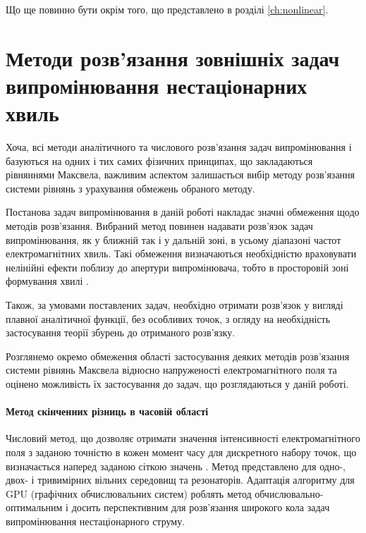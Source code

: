 Що ще повинно бути окрім того, що представлено в розділі \ref{ch:nonlinear}.

\section{Методи розв'язання зовнішніх задач випромінювання нестаціонарних хвиль}

Хоча, всі методи аналітичного та числового розв'язання задач 
випромінювання і базуються на одних і тих самих фізичних принципах, що 
закладаються рівняннями Максвела, важливим аспектом залишається вибір 
методу розв'язання системи рівнянь з урахування обмежень обраного методу. 

Постанова задач випромінювання в даній роботі накладає значні обмеження щодо 
методів розв'язання. Вибраний метод повинен надавати розв'язок задач 
випромінювання, як у ближній так і у дальній зоні, в усьому діапазоні 
частот електромагнітних хвиль. Такі обмеження визначаються 
необхідністю враховувати нелінійні ефекти поблизу до апертури випромінювача, 
тобто в просторовій зоні формування хвилі \cite{imp:BaumUWBSP1}.

Також, за умовами поставлених задач, необхідно отримати розв'язок у вигляді
плавної аналітичної функції, без особливих точок, з огляду на необхідність 
застосування теорії збурень до отриманого розв'язку. 


Розглянемо окремо обмеження області застосування деяких методів 
розв'язання системи рівнянь Максвела відносно напруженості 
електромагнітного поля та оцінено можливість їх застосування до задач, 
що розглядаються у даній роботі.

\paragraph{Метод скінченних різниць в часовій області}

Числовий метод, що дозволяє отримати значення інтенсивності електромагнітного 
поля з заданою точністю в кожен момент часу для дискретного набору точок, що
визначається наперед заданою сіткою значень \cite{imp:FDTD1966}. Метод 
представлено для одно-, двох- і тривимірних \cite{imp:FDTD1975} вільних 
середовищ та резонаторів. Адаптація алгоритму для GPU (графічних 
обчислювальних систем) \cite{imp:FDTD2011} роблять метод 
обчислювально-оптимальним і досить перспективним для розв'язання 
широкого кола задач випромінювання нестаціонарного струму.

